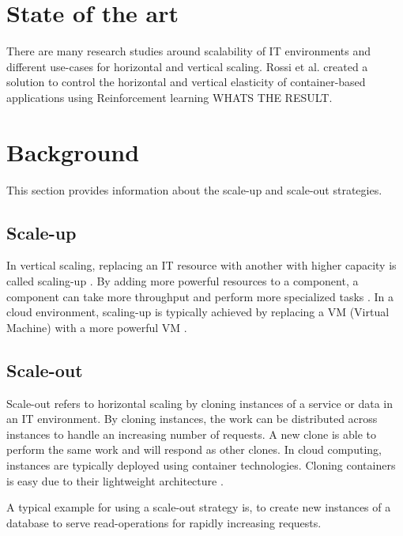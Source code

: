 \documentclass{article}
\begin{document}
\section{State of the art}
There are many research studies around scalability of IT environments and different use-cases for horizontal and vertical scaling. Rossi et al. \cite{Rossi2019HorAndVert} created a solution to control the horizontal and vertical elasticity of container-based applications using Reinforcement learning  WHATS THE RESULT. 


\section{Background}

This section provides information about the scale-up and scale-out strategies.

\subsection{Scale-up}
In vertical scaling, replacing an IT resource with another with higher capacity is called scaling-up \cite{Mahmood2013CloudConcepts}. By adding more powerful resources to a component, a component can take more throughput and perform more specialized tasks \cite{Abbott2015ScalabilityArt}.
In a cloud environment, scaling-up is typically achieved by replacing a VM (Virtual Machine) with a more powerful VM \cite{Mahmood2013CloudConcepts}.



\subsection{Scale-out}
Scale-out refers to horizontal scaling by cloning instances of a service or data in an IT environment. By cloning instances, the work can be distributed across instances to handle an increasing number of requests. A new clone is able to perform the same work and will respond as other clones.
In cloud computing, instances are typically deployed using container technologies. Cloning containers is easy due to their lightweight architecture \cite{Abbott2015ScalabilityArt}.


A typical example for using a scale-out strategy is, to create new instances of a database to serve read-operations for rapidly increasing requests.
\end{document}
